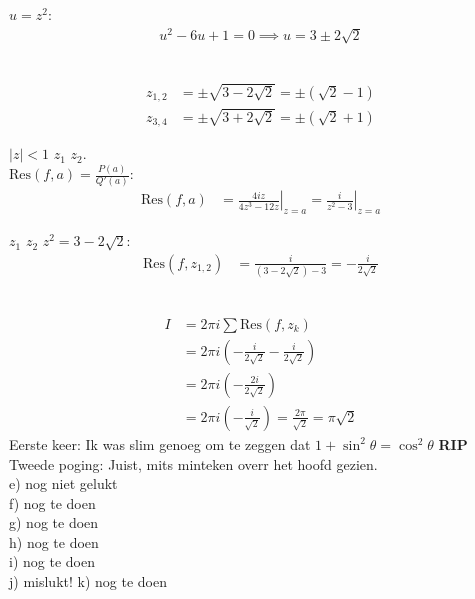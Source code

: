 \documentclass[a4paper,twoside]{article}
\theoremstyle{definition}
\theoremstyle{plain}
\begin{document}
 $u = z^2$: \\
\begin{align*}
u^2 - 6u + 1 = 0 \implies u = 3 \pm 2\sqrt{2}
\end{align*}

 \\
\begin{align*}
z_{1,2} &= \pm \sqrt{3 - 2\sqrt{2}} = \pm (\sqrt{2} - 1) \\
z_{3,4} &= \pm \sqrt{3 + 2\sqrt{2}} = \pm (\sqrt{2} + 1)
\end{align*}

 $|z| < 1$  $z_1$  $z_2$. \\
 $\text{Res}(f, a) = \frac{P(a)}{Q'(a)}$: \\
\begin{align*}
\text{Res}(f, a) &= \left. \frac{4iz}{4z^3 - 12z} \right|_{z=a} = \left. \frac{i}{z^2 - 3} \right|_{z=a}
\end{align*}

 $z_1$  $z_2$  $z^2 = 3 - 2\sqrt{2}$: \\
\begin{align*}
\text{Res}(f, z_{1,2}) &= \frac{i}{(3 - 2\sqrt{2}) - 3} = -\frac{i}{2\sqrt{2}}
\end{align*}

 \\
\begin{align*}
I &= 2\pi i \sum \text{Res}(f, z_k) \\
&= 2\pi i \left( -\frac{i}{2\sqrt{2}} - \frac{i}{2\sqrt{2}} \right) \\
&= 2\pi i \left( -\frac{2i}{2\sqrt{2}} \right) \\
&= 2\pi i \left( -\frac{i}{\sqrt{2}} \right) = \frac{2\pi}{\sqrt{2}} = \pi\sqrt{2}
\end{align*}
Eerste keer: Ik was slim genoeg om te zeggen dat \(1+\sin^2\theta = \cos^2\theta\) \textbf{RIP}\\
Tweede poging: Juist, mits minteken overr het hoofd gezien.\\
e) nog niet gelukt\\
f) nog te doen\\
g) nog te doen\\
h) nog te doen\\
i) nog te doen\\
j) mislukt!
k) nog te doen\\
\end{document}
